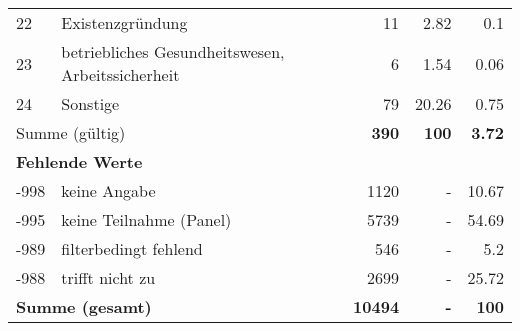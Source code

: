 \begin{longtable}{lXrrr}
        22 & \multicolumn{1}{X}{Existenzgründung} & %
          \num{11} &
          \num[round-mode=places,round-precision=2]{2.82} &
          \num[round-mode=places,round-precision=2]{0.1} \\

        23 & \multicolumn{1}{X}{betriebliches Gesundheitswesen, Arbeitssicherheit} & %
          \num{6} &
          \num[round-mode=places,round-precision=2]{1.54} &
          \num[round-mode=places,round-precision=2]{0.06} \\

        24 & \multicolumn{1}{X}{Sonstige} & %
          \num{79} &
          \num[round-mode=places,round-precision=2]{20.26} &
          \num[round-mode=places,round-precision=2]{0.75} \\

     \midrule
     \multicolumn{2}{l}{Summe (gültig)} &
       \textbf{\num{390}} &
     \textbf{\num{100}} &
       \textbf{\num[round-mode=places,round-precision=2]{3.72}} \\
     \multicolumn{5}{l}{\textbf{Fehlende Werte}}\\
       -998 &
       keine Angabe &
         \num{1120} &
        - &
         \num[round-mode=places,round-precision=2]{10.67} \\
       -995 &
       keine Teilnahme (Panel) &
         \num{5739} &
        - &
         \num[round-mode=places,round-precision=2]{54.69} \\
       -989 &
       filterbedingt fehlend &
         \num{546} &
        - &
         \num[round-mode=places,round-precision=2]{5.2} \\
       -988 &
       trifft nicht zu &
         \num{2699} &
        - &
         \num[round-mode=places,round-precision=2]{25.72} \\
     \midrule
     \multicolumn{2}{l}{\textbf{Summe (gesamt)}} &
          \textbf{\num{10494}} &
        \textbf{-} &
        \textbf{\num{100}} \\
     \bottomrule
     \end{longtable}
     
